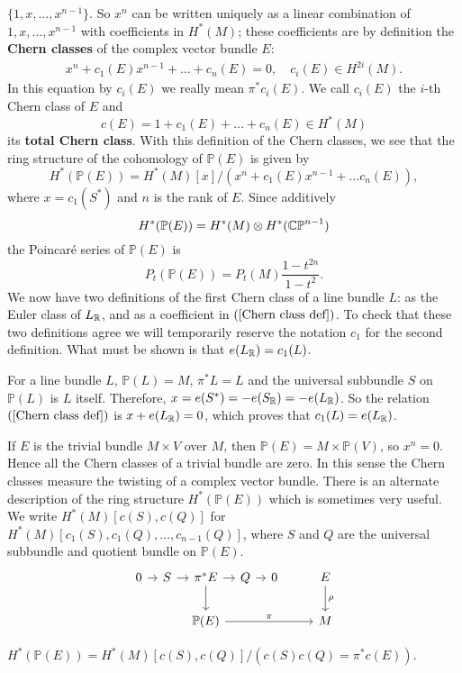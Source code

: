 $\{1,x,\dots,x^{n-1}\}$. So $x^n$ can be written uniquely as a linear combination of $1,x,\dots,x^{n-1}$ with coefficients in $H^*(M)$; these coefficients are by 
definition the \textbf{Chern classes} of the complex vector bundle $E$:
\begin{align}\label{Chern class def}
x^n+c_1(E)x^{n-1}+\dots+c_n(E)=0,\quad c_i(E)\in H^{2i}(M).
\end{align}
In this equation by $c_i(E)$ we really mean $\pi^*c_i(E)$. We call $c_i(E)$ the $i$-th Chern class of $E$ and
\[c(E)=1+c_1(E)+\dots+c_n(E)\in H^*(M)\]
its \textbf{total Chern class}. With this definition of the Chern classes, we see that the ring structure of the cohomology of $\mathbb{P}(E)$ is given by
\[H^*(\mathbb{P}(E))=H^*(M)[x]/(x^n+c_1(E)x^{n-1}+\dots c_n(E)),\]
where $x=c_1(S^*)$ and $n$ is the rank of $E$. Since additively
\[H^*(\mathbb{P}(E))=H^*(M)\otimes H^*(\mathbb{CP}^{n-1})\]
the Poincar\'e series of $\mathbb{P}(E)$ is
\[P_t(\mathbb{P}(E))=P_t(M)\frac{1-t^{2n}}{1-t^2}.\]
We now have two definitions of the first Chern class of a line bundle $L$: as the Euler class of $L_{\mathbb{R}}$, and as a coefficient in $(\ref{Chern class def})$. To check 
that these two definitions agree we will temporarily reserve the notation $c_1$ for the second definition. What must be shown is that $e(L_{\mathbb{R}})=c_1(L)$.\par
For a line bundle $L$, $\mathbb{P}(L)=M$, $\pi^*L=L$ and the universal subbundle $S$ on $\mathbb{P}(L)$ is $L$ itself. Therefore, $x=e(S^*)=-e(S_{\mathbb{R}})=-e(L_{\mathbb{R}})$. So 
the relation $(\ref{Chern class def})$ is $x+e(L_{\mathbb{R}})=0$, which proves that $c_1(L)=e(L_{\mathbb{R}})$.\par
If $E$ is the trivial bundle $M\times V$ over $M$, then $\mathbb{P}(E)=M\times\mathbb{P}(V)$, so $x^n=0$. Hence all the Chern classes of a trivial bundle are zero. In 
this sense the Chern classes measure the twisting of a complex vector bundle.
There is an alternate description of the ring structure $H^*(\mathbb{P}(E))$ which is sometimes very useful. We write $H^*(M)[c(S),c(Q)]$ for $H^*(M)[c_1(S),c_1(Q),\dots,c_{n-1}(Q)]$, 
where $S$ and $Q$ are the universal subbundle and quotient bundle on $\mathbb{P}(E)$.
\[\begin{tikzcd}[column sep=0.8em]
0\ar[r]&S\ar[r]&\pi^*E\ar[d]\ar[r]&Q\ar[r]&0&&&E\ar[d,"\rho"]\\
&&\mathbb{P}(E)\ar[rrrrr,"\pi"]&&&&&M
\end{tikzcd}\]
\begin{proposition}\label{cohomology P(E) description}
$H^*(\mathbb{P}(E))=H^*(M)[c(S),c(Q)]/(c(S)c(Q)=\pi^*c(E))$.
\end{proposition}
